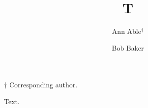 \documentclass{article}
\begin{document}
\title{T}
\author{Ann Able$^{\dagger}$ \and Bob Baker}
\date{}
\maketitle
\noindent $\dagger$ Corresponding author.

Text.
\end{document}
